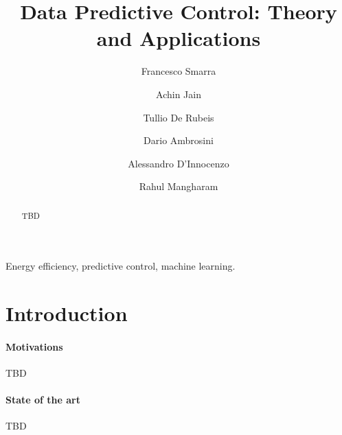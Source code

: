 \documentclass[review]{elsarticle}
\begin{document}
\begin{frontmatter}

\title{Data Predictive Control: Theory and Applications}

\author[FSaddress,EC]{Francesco Smarra}

\author[AJaddress,EC]{Achin Jain}
\author[TDRaddress,EC]{Tullio De Rubeis}
\author[TDRaddress]{Dario Ambrosini}
\author[FSaddress]{Alessandro D'Innocenzo}
\author[AJaddress]{Rahul Mangharam}

\address[EC]{Equal contribution}
\address[FSaddress]{Department of Information Engineering, Computer Science and Mathematics, Università degli Studi dell’Aquila, L’Aquila, Italy}
\address[TDRaddress]{Department of Industrial and Information Engineering and Economics, Università degli Studi dell’Aquila, L’Aquila, Italy}
\address[AJaddress]{Department of Electrical and Systems Engineering, University of Pennsylvania, Philadelphia, USA}

\begin{abstract}
TBD
\end{abstract}

\begin{keyword}
Energy efficiency, predictive control, machine learning.
\end{keyword}

\end{frontmatter}


\section{Introduction}

\paragraph{Motivations} TBD

\paragraph{State of the art} TBD
\end{document}
